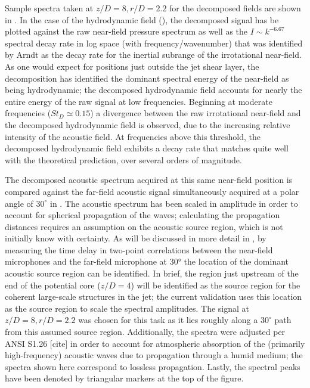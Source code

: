 Sample spectra taken at $z/D = 8, r/D = 2.2$ for the decomposed fields are shown in .
In the case of the hydrodynamic field (), the decomposed signal has be plotted against the raw near-field pressure spectrum as well as the $I \sim k^{-6.67}$ spectral decay rate in log space (with frequency/wavenumber) that was identified by Arndt \etal [cite] as the decay rate for the inertial subrange of the irrotational near-field.
As one would expect for positions just outside the jet shear layer, the decomposition has identified the dominant spectral energy of the near-field as being hydrodynamic; the decomposed hydrodynamic field accounts for nearly the entire energy of the raw signal at low frequencies.
Beginning at moderate frequencies ($St_D \simeq 0.15$) a divergence between the raw irrotational near-field and the decomposed hydrodynamic field is observed, due to the increasing relative intensity of the acoustic field.
At frequencies above this threshold, the decomposed hydrodynamic field exhibits a decay rate that matches quite well with the theoretical prediction, over several orders of magnitude. 

The decomposed acoustic spectrum acquired at this same near-field position is compared against the far-field acoustic signal simultaneously acquired at a polar angle of $30^\circ$ in .
The acoustic spectrum has been scaled in amplitude in order to account for spherical propagation of the waves; calculating the propagation distances requires an assumption on the acoustic source region, which is not initially know with certainty.
As will be discussed in more detail in , by measuring the time delay in two-point correlations between the near-field microphones and the far-field microphone at 30° the location of the dominant acoustic source region can be identified. 
In brief, the region just upstream of the end of the potential core ($z/D =4$) will be identified as the source region for the coherent large-scale structures in the jet; the current validation uses this location as the source region to scale the spectral amplitudes.
The signal at $z/D = 8, r/D = 2.2$ was chosen for this task as it lies roughly along a $30^\circ$ path from this assumed source region.
Additionally, the spectra were adjusted per ANSI S1.26 [cite] in order to account for atmospheric absorption of the (primarily high-frequency) acoustic waves due to propagation through a humid medium; the spectra shown here correspond to lossless propagation.
Lastly, the spectral peaks have been denoted by triangular markers at the top of the figure. 

